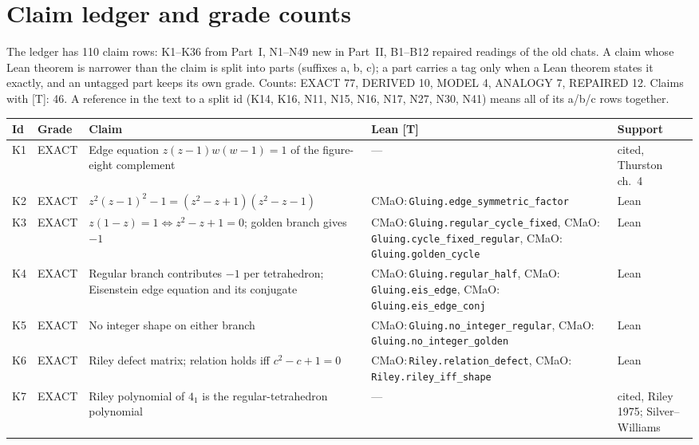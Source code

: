 \documentclass[11pt]{article}
\theoremstyle{definition}
\newcommand{\lean}[1]{\texttt{\small #1}}
\begin{document}
\section{Claim ledger and grade counts}\label{sec:ledger}
The ledger has 110 claim rows: K1--K36 from Part~I, N1--N49 new in Part~II, B1--B12 repaired readings of the old chats. A claim whose Lean theorem is narrower than the claim is split into parts (suffixes a, b, c); a part carries a tag only when a Lean theorem states it exactly, and an untagged part keeps its own grade. Counts: EXACT 77, DERIVED 10, MODEL 4, ANALOGY 7, REPAIRED 12. Claims with \textsf{[T]}: 46. A reference in the text to a split id (K14, K16, N11, N15, N16, N17, N27, N30, N41) means all of its a/b/c rows together.
{\small\begin{longtable}{@{}L{0.05\textwidth}L{0.12\textwidth}L{0.26\textwidth}L{0.27\textwidth}L{0.17\textwidth}@{}}
\toprule Id & Grade & Claim & Lean \textsf{[T]} & Support\\ \midrule\endhead
K1 & EXACT & Edge equation $z(z-1)w(w-1)=1$ of the figure-eight complement & --- & cited, Thurston ch.~4\\
K2 & EXACT & $z^2(z-1)^2-1=(z^2-z+1)(z^2-z-1)$ & CMaO:\,\lean{Gluing.\allowbreak{}edge\_\allowbreak{}symmetric\_\allowbreak{}factor} & Lean\\
K3 & EXACT & $z(1-z)=1\iff z^2-z+1=0$; golden branch gives $-1$ & CMaO:\,\lean{Gluing.\allowbreak{}regular\_\allowbreak{}cycle\_\allowbreak{}fixed}, CMaO:\,\lean{Gluing.\allowbreak{}cycle\_\allowbreak{}fixed\_\allowbreak{}regular}, CMaO:\,\lean{Gluing.\allowbreak{}golden\_\allowbreak{}cycle} & Lean\\
K4 & EXACT & Regular branch contributes $-1$ per tetrahedron; Eisenstein edge equation and its conjugate & CMaO:\,\lean{Gluing.\allowbreak{}regular\_\allowbreak{}half}, CMaO:\,\lean{Gluing.\allowbreak{}eis\_\allowbreak{}edge}, CMaO:\,\lean{Gluing.\allowbreak{}eis\_\allowbreak{}edge\_\allowbreak{}conj} & Lean\\
K5 & EXACT & No integer shape on either branch & CMaO:\,\lean{Gluing.\allowbreak{}no\_\allowbreak{}integer\_\allowbreak{}regular}, CMaO:\,\lean{Gluing.\allowbreak{}no\_\allowbreak{}integer\_\allowbreak{}golden} & Lean\\
K6 & EXACT & Riley defect matrix; relation holds iff $c^2-c+1=0$ & CMaO:\,\lean{Riley.\allowbreak{}relation\_\allowbreak{}defect}, CMaO:\,\lean{Riley.\allowbreak{}riley\_\allowbreak{}iff\_\allowbreak{}shape} & Lean\\
K7 & EXACT & Riley polynomial of $4_1$ is the regular-tetrahedron polynomial & --- & cited, Riley 1975; Silver--Williams\\

\end{longtable}}
\end{document}
